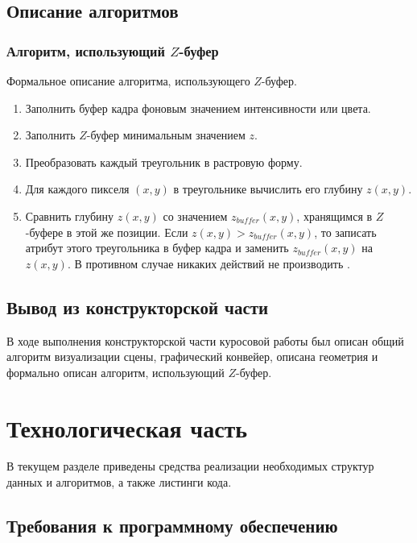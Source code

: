 \section{Описание алгоритмов}

\subsection{Алгоритм, использующий $Z$-буфер}

Формальное описание алгоритма, использующего $Z$-буфер.

\begin{enumerate}
\item
Заполнить буфер кадра фоновым значением интенсивности или цвета.
\item
Заполнить $Z$-буфер минимальным значением $z$.
\item
Преобразовать каждый треугольник в растровую форму.
\item
Для каждого пикселя $(x, y)$ в треугольнике вычислить его глубину $z(x, y)$.
\item
Сравнить глубину $z(x, y)$ со значением $z_{buffer}(x, y)$, хранящимся в $Z$-буфере в этой же позиции. 
Если $z(x, y) > z_{buffer}(x, y)$, то записать атрибут этого треугольника в буфер кадра и заменить $z_{buffer}(x, y)$ на $z(x, y)$. 
В противном случае никаких действий не производить \cite{Demin2005}.
\end{enumerate}

\section*{Вывод из конструкторской части}

В ходе выполнения конструкторской части куросовой работы был описан общий алгоритм визуализации сцены, графический конвейер, описана геометрия и формально описан алгоритм, использующий $Z$-буфер.

\chapter{Технологическая часть}

В текущем разделе приведены средства реализации необходимых структур данных и алгоритмов, а также листинги кода.

\section{Требования к программному обеспечению}

